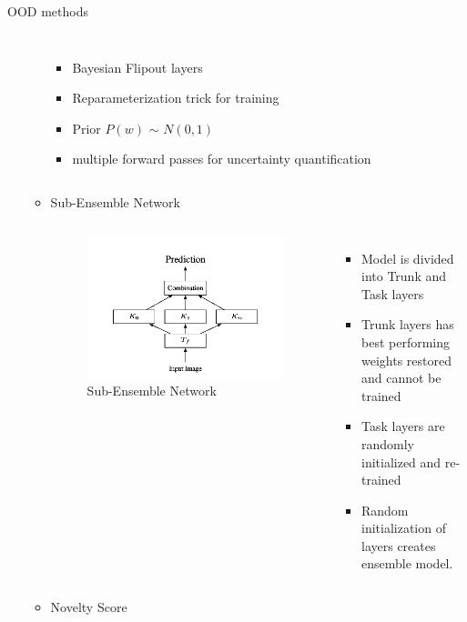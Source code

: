 \documentclass[10pt, aspectratio=169]{beamer}
\begin{document}
\begin{frame}[allowframebreaks]{OOD methods}
\begin{itemize}
\begin{itemize}
\begin{columns}
                    \begin{itemize}
                        \item Bayesian Flipout layers \citep{Wen2018}
                        \item Reparameterization trick for training \citep{Kingma2015}
                        \item Prior $P(w)$ $\sim$ $N(0, 1)$
                        \item multiple forward passes for uncertainty quantification \newline \newline
                    \end{itemize}
            \end{columns} 
            \pagebreak
            \item Sub-Ensemble Network 
            \begin{columns}
                    \begin{figure}
                        \includegraphics[scale=0.275]{images/subensembles.png}
                        \caption{Sub-Ensemble Network}
                    \end{figure}
                    \begin{itemize}
                        \item Model is divided into Trunk and Task layers
                        \item Trunk layers has best performing weights restored and cannot be trained
                        \item Task layers are randomly initialized and re-trained
                        \item Random initialization of layers creates ensemble model. 
                    \end{itemize}
            \end{columns} \newpage
            \item Novelty Score \newline
            

\end{itemize}
\end{itemize}
\end{frame}
\end{document}
